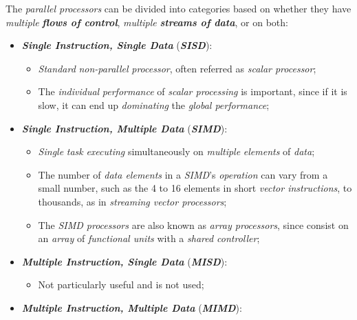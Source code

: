 \noindent The \emph{parallel processors} can be divided into categories based on whether they have \emph{multiple} \textbf{\emph{flows of control}}, \emph{multiple} \textbf{\emph{streams of data}}, or on both:
\begin{itemize}
    \vspace{-0.2cm}
    \item \textbf{\emph{Single Instruction, Single Data}} (\textbf{\emph{SISD}}):
    \begin{itemize}
        \vspace{-0.2cm}
        \item \emph{Standard} \emph{non-parallel} \emph{processor}, often referred as \emph{scalar processor};
        \item The \emph{individual} \emph{performance} of \emph{scalar processing} is important, since if it is slow, it can end up \emph{dominating} the \emph{global performance};
    \end{itemize}
    \item \textbf{\emph{Single Instruction, Multiple Data}} (\textbf{\emph{SIMD}}):
    \begin{itemize}
        \vspace{-0.2cm}
        \item \emph{Single} \emph{task} \emph{executing} simultaneously on \emph{multiple} \emph{elements} of \emph{data};
        \item The number of \emph{data elements} in a \emph{SIMD}'s \emph{operation} can vary from a small number, such as the 4 to 16 elements in short \emph{vector instructions}, to thousands, as in \emph{streaming vector processors};
        \item The \emph{SIMD processors} are also known as \emph{array processors}, since consist on an \emph{array} of \emph{functional units} with a \emph{shared controller};
    \end{itemize}
    \item \textbf{\emph{Multiple Instruction, Single Data}} (\textbf{\emph{MISD}}):
    \begin{itemize}
        \vspace{-0.2cm}
        \item Not particularly useful and is not used;
    \end{itemize}
    \item \textbf{\emph{Multiple Instruction, Multiple Data}} (\textbf{\emph{MIMD}}):
    \begin{itemize}
        \vspace{-0.2cm}

\end{itemize}
\end{itemize}

